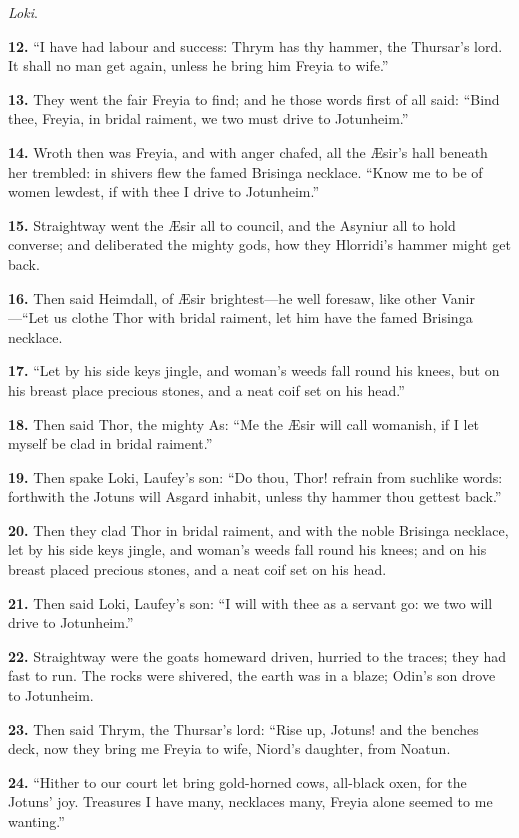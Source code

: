 \emph{Loki}.

\textbf{12.} ``I have had labour and success: Thrym has thy hammer, the
Thursar's lord. It shall no man get again, unless he bring him Freyia
to wife.''

\textbf{13.} They went the fair Freyia to find; and he those words first of
all said: ``Bind thee, Freyia, in bridal raiment, we two must drive to
Jotunheim.''

\textbf{14.} Wroth then was Freyia, and with anger chafed, all the Æsir's
hall beneath her trembled: in shivers flew the famed Brisinga
necklace. ``Know me to be of women lewdest, if with thee I drive to
Jotunheim.''

\textbf{15.} Straightway went the Æsir all to council, and the Asyniur all to
hold converse; and deliberated the mighty gods, how they Hlorridi's
hammer might get back.

\textbf{16.} Then said Heimdall, of Æsir brightest—he well foresaw, like
other Vanir—``Let us clothe Thor with bridal raiment, let him have the
famed Brisinga necklace.

\textbf{17.} ``Let by his side keys jingle, and woman's weeds fall round his
knees, but on his breast place precious stones, and a neat coif set on
his head.''

\textbf{18.} Then said Thor, the mighty As: ``Me the Æsir will call womanish,
if I let myself be clad in bridal raiment.''

\textbf{19.} Then spake Loki, Laufey's son: ``Do thou, Thor! refrain from
suchlike words: forthwith the Jotuns will Asgard inhabit, unless thy
hammer thou gettest back.''

\textbf{20.} Then they clad Thor in bridal raiment, and with the noble
Brisinga necklace, let by his side keys jingle, and woman's weeds fall
round his knees; and on his breast placed precious stones, and a neat
coif set on his head.

\textbf{21.} Then said Loki, Laufey's son: ``I will with thee as a servant go:
we two will drive to Jotunheim.''

\textbf{22.} Straightway were the goats homeward driven, hurried to the
traces; they had fast to run. The rocks were shivered, the earth was
in a blaze; Odin's son drove to Jotunheim.

\textbf{23.} Then said Thrym, the Thursar's lord: ``Rise up, Jotuns! and the
benches deck, now they bring me Freyia to wife, Niord's daughter, from
Noatun.

\textbf{24.} ``Hither to our court let bring gold-horned cows, all-black oxen,
for the Jotuns' joy. Treasures I have many, necklaces many, Freyia
alone seemed to me wanting.''

